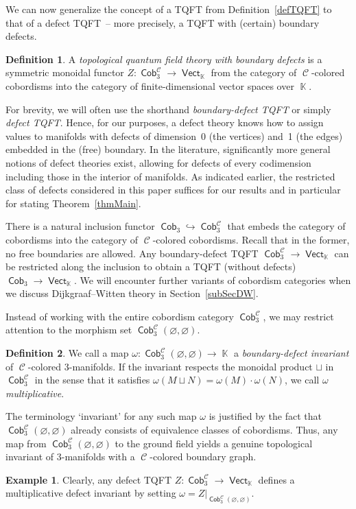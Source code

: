 \documentclass[pdftex]{sigma}
\DeclareMathOperator{\vect}{\mathsf{Vect}}
\DeclareMathOperator{\K}{\mathbb{K}}
\DeclareMathOperator{\Cob}{\mathsf{Cob}}
\DeclareMathOperator{\calc}{\mathcal{C}}
\numberwithin{equation}{section}
\theoremstyle{definition}
\newtheorem{Definition}[Definition]{Definition}
\newtheorem{Example}[Example]{Example}
\begin{document}
We can now generalize the concept of a TQFT from Definition~\ref{defTQFT} to that of a defect TQFT~-- more precisely, a TQFT with (certain) boundary defects.
\begin{Definition}\label{defTQFTDef}
 A \textit{topological quantum field theory with boundary defects} is a symmetric monoidal functor $Z\colon \Cob_3^{\calc} \rightarrow \vect_{\K}$ from the category of $\calc$-colored cobordisms into the category of finite-dimensional vector spaces over $\K$.
\end{Definition}
For brevity, we will often use the shorthand \textit{boundary-defect TQFT} or simply \textit{defect TQFT}.
Hence, for our purposes, a defect theory knows how to assign values to manifolds with defects of dimension~0 (the vertices) and~1 (the edges) embedded in the (free) boundary. In the literature, significantly more general notions of defect theories exist, allowing for defects of every codimension including those in the interior of manifolds. As indicated earlier, the restricted class of defects considered in this paper suffices for our results and in particular for stating Theorem~\ref{thmMain}.

There is a natural inclusion functor $\Cob_3 \hookrightarrow \Cob_3^{\calc}$ that embeds the category of cobordisms into the category of $\calc$-colored cobordisms. Recall that in the former, no free boundaries are allowed. Any boundary-defect TQFT $\Cob_3^{\calc} \rightarrow \vect_{\K}$ can be restricted along the inclusion to obtain a TQFT (without defects) $\Cob_3 \rightarrow \vect_{\K}$.
We will encounter further variants of cobordism categories when we discuss Dijkgraaf--Witten theory in Section~\ref{subSecDW}.

Instead of working with the entire cobordism category $\Cob_3^{\calc}$, we may restrict attention to the morphism set $\Cob_3^{\calc}(\varnothing, \varnothing)$.

\begin{Definition}\label{defInv}
 We call a map $\omega\colon \Cob_3^{\calc}(\varnothing, \varnothing) \rightarrow \K$ a \textit{boundary-defect invariant} of $\calc$-colored 3-manifolds. If the invariant respects the monoidal product $\sqcup$ in $\Cob_3^{\calc}$ in the sense that it satisfies $\omega(M \sqcup N) = \omega(M) \cdot \omega(N)$, we call $\omega$ \textit{multiplicative}.
\end{Definition}
The terminology `invariant' for any such map $\omega$ is justified by the fact that $\Cob_3^{\calc}(\varnothing, \varnothing)$ already consists of equivalence classes of cobordisms. Thus, any map from $\Cob_3^{\calc}(\varnothing, \varnothing)$ to the ground field yields a genuine topological invariant of 3-manifolds with a $\calc$-colored boundary graph.
\begin{Example}
 Clearly, any defect TQFT $Z\colon \Cob_3^{\calc} \rightarrow \vect_{\K}$ defines a multiplicative defect invariant by setting $\omega = Z|_{\Cob_3^{\calc}(\varnothing, \varnothing)}$.
\end{Example}
\end{document}
